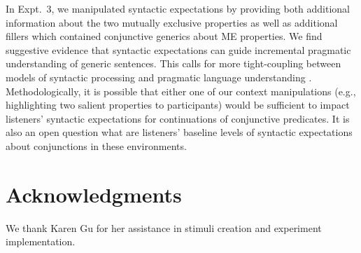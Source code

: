 \documentclass[10pt,letterpaper]{article}
\begin{document}
In Expt.~3, we manipulated syntactic expectations by providing both additional information about the two mutually exclusive properties as well as additional fillers which contained conjunctive generics about ME properties. 
We find suggestive evidence that syntactic expectations can guide incremental pragmatic understanding of generic sentences. 
This calls for more tight-coupling between models of syntactic processing \cite{Levy2008} and pragmatic language understanding \cite{Goodman2016}. 
Methodologically, it is possible that either one of our context manipulations (e.g., highlighting two salient properties to participants) would be sufficient to impact listeners' syntactic expectations for continuations of conjunctive predicates.
It is also an open question what are listeners' baseline levels of syntactic expectations about conjunctions in these environments. 






\section{Acknowledgments}

We thank Karen Gu for her assistance in stimuli creation and experiment implementation.




\setlength{\bibleftmargin}{.125in}
\setlength{\bibindent}{-\bibleftmargin}


\end{document}
